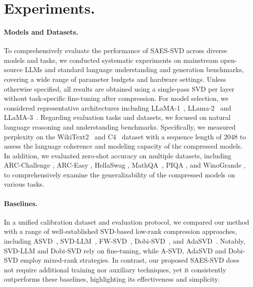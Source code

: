 \section{Experiments.}    
\paragraph{Models and Datasets.} 
To comprehensively evaluate the performance of SAES-SVD across diverse models and tasks, we conducted systematic experiments on mainstream open-source LLMs and standard language understanding and generation benchmarks, covering a wide range of parameter budgets and hardware settings. Unless otherwise specified, all results are obtained using a single-pass SVD per layer without task-specific fine-tuning after compression. For model selection, we considered representative architectures including LLaMA-1~\citep{touvron2023llama}, LLama-2~\citep{touvron2023llama2} and LLaMA-3~\citep{Meta2024Llama3}. Regarding evaluation tasks and datasets, we focused on natural language reasoning and understanding benchmarks. Specifically, we measured perplexity on the WikiText2~\citep{merity2016pointer} and C4~\citep{raffel2020exploring} dataset with a sequence length of 2048 to assess the language coherence and modeling capacity of the compressed models. In addition, we evaluated zero-shot accuracy on multiple datasets, including ARC-Challenge \citep{clark2018think}, ARC-Easy \citep{clark2018think}, HellaSwag \citep{zellers2019hellaswag}, MathQA~\citep{amini2019mathqa}, PIQA \citep{bisk2020piqa}, and WinoGrande \citep{sakaguchi2021winogrande}, to comprehensively examine the generalizability of the compressed models on various tasks.
\vspace{-0.3cm}
\paragraph{Baselines.}
In a unified calibration dataset and evaluation protocol, we compared our method with a range of well-established SVD-based low-rank compression approaches, including ASVD~\citep{li2025adasvd}, SVD-LLM~\citep{Wang2024SVD-LLM}, FW-SVD~\citep{Hsu2022FWSVD}, Dobi-SVD~\citep{wang2025dobi}, and AdaSVD~\citep{li2025adasvd}. Notably, SVD-LLM and Dobi-SVD rely on fine-tuning, while A-SVD, AdaSVD and Dobi-SVD employ mixed-rank strategies. In contrast, our proposed SAES-SVD does not require additional training nor auxiliary techniques, yet it consistently outperforms these baselines, highlighting its effectiveness and simplicity.

